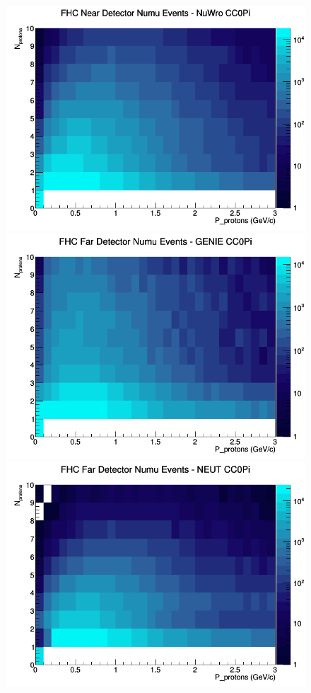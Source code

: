 \documentclass[12pt]{article}
\begin{document}
\begin{figure}[h]
\includegraphics[width=\linewidth]{N_P/nominal/protons/CC0Pi_FHC_ND_numu_N_P_NuWro.png}
\endminipage
\newline
{}
\includegraphics[width=\linewidth]{N_P/nominal/protons/CC0Pi_FHC_FD_numu_N_P_GENIE.png}
\endminipage
{}
\includegraphics[width=\linewidth]{N_P/nominal/protons/CC0Pi_FHC_FD_numu_N_P_NEUT.png}

\end{figure}
\end{document}
